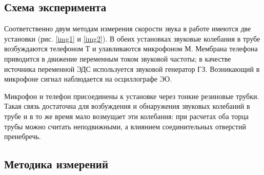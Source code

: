 \documentclass[12pt,a4paper]{article}
\begin{document}
\subsection{Схема эксперимента}

Соответственно двум методам измерения скорости звука в работе имеются две установки (рис. \ref{img1} и \ref{img2}). В обеих установках звуковые колебания в трубе возбуждаются телефоном Т и улавливаются микрофоном М. Мембрана телефона приводится в движение переменным током звуковой частоты; в качестве источника переменной ЭДС используется звуковой генератор ГЗ. Возникающий в микрофоне сигнал наблюдается на осциллографе ЭО.

Микрофон и телефон присоединены к установке через тонкие резиновые трубки. Такая связь достаточна для возбуждения и обнаружения звуковых колебаний в трубе и в то же время мало возмущает эти колебания: при расчетах оба торца трубы можно считать неподвижными, а влиянием соединительных отверстий пренебречь.

\subsection{Методика измерений}
\end{document}
